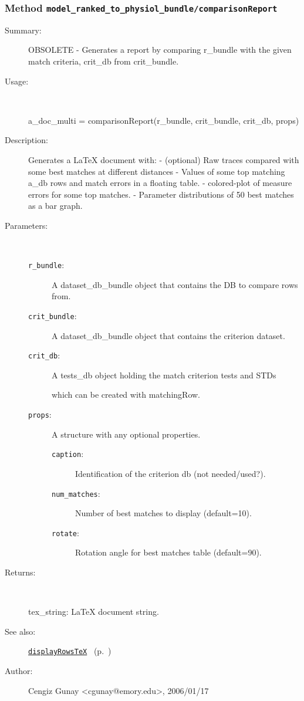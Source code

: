 \subsubsection[Method \texttt{comparisonReport}]{Method \texttt{model\_ranked\_to\_physiol\_bundle/comparisonReport}}%
%
\label{ref_model_ranked_to_physiol_bundle__comparisonReport}%
\hypertarget{ref_model_ranked_to_physiol_bundle__comparisonReport}{}%
\begin{description}
\item[Summary:]OBSOLETE - Generates a report by comparing r\_bundle with the given match criteria, crit\_db from crit\_bundle.
%
\item[Usage:]~%
\begin{lyxcode}%
a\_doc\_multi = comparisonReport(r\_bundle, crit\_bundle, crit\_db, props)
%
\end{lyxcode}%
%
\item[Description:]%
Generates a LaTeX document with:
	- (optional) Raw traces compared with some best matches at different distances
	- Values of some top matching a\_db rows and match errors in a floating table.
	- colored-plot of measure errors for some top matches.
	- Parameter distributions of 50 best matches as a bar graph.
\item[Parameters:]~
\begin{description}%
\item[\texttt{r\_bundle}:]
 A dataset\_db\_bundle object that contains the DB to compare rows from.
\item[\texttt{crit\_bundle}:]
 A dataset\_db\_bundle object that contains the criterion dataset.
\item[\texttt{crit\_db}:]
 A tests\_db object holding the match criterion tests and STDs

which can be created with matchingRow.\item[\texttt{props}:]
 A structure with any optional properties.
\begin{description}%
\item[\texttt{caption}:]
 Identification of the criterion db (not needed/used?).
\item[\texttt{num\_matches}:]
 Number of best matches to display (default=10).
\item[\texttt{rotate}:]
 Rotation angle for best matches table (default=90).
\end{description}%
\end{description}%
%
\item[Returns:]~

	tex\_string: LaTeX document string.
%
%
\item[See also:]%
\hyperlink{ref_displayRowsTeX}{\texttt{displayRowsTeX}}%
\ (p.~\pageref{ref_displayRowsTeX})%
%
%
\item[Author:]%
Cengiz Gunay <cgunay@emory.edu>, 2006/01/17%
\end{description}
\methodline%
